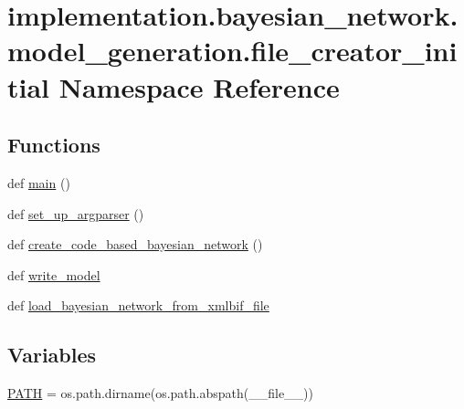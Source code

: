 \hypertarget{namespaceimplementation_1_1bayesian__network_1_1model__generation_1_1file__creator__initial}{}\section{implementation.\+bayesian\+\_\+network.\+model\+\_\+generation.\+file\+\_\+creator\+\_\+initial Namespace Reference}
\label{namespaceimplementation_1_1bayesian__network_1_1model__generation_1_1file__creator__initial}
\subsection*{Functions}
\begin{DoxyCompactItemize}
\item 
def \hyperlink{namespaceimplementation_1_1bayesian__network_1_1model__generation_1_1file__creator__initial_acbabd68f282f46c4163f51f4105cf89b}{main} ()
\item 
def \hyperlink{namespaceimplementation_1_1bayesian__network_1_1model__generation_1_1file__creator__initial_abcafef44805ec64399b6960daaa32b65}{set\+\_\+up\+\_\+argparser} ()
\item 
def \hyperlink{namespaceimplementation_1_1bayesian__network_1_1model__generation_1_1file__creator__initial_a03c80ffdeb14f95f6c3306e00e57734f}{create\+\_\+code\+\_\+based\+\_\+bayesian\+\_\+network} ()
\item 
def \hyperlink{namespaceimplementation_1_1bayesian__network_1_1model__generation_1_1file__creator__initial_a98d88f0c32f8caacc0f858c06b57e274}{write\+\_\+model}
\item 
def \hyperlink{namespaceimplementation_1_1bayesian__network_1_1model__generation_1_1file__creator__initial_ad52465018b3b77cc8304c9b6c8722225}{load\+\_\+bayesian\+\_\+network\+\_\+from\+\_\+xmlbif\+\_\+file}
\end{DoxyCompactItemize}
\subsection*{Variables}
\begin{DoxyCompactItemize}
\item 
\hyperlink{namespaceimplementation_1_1bayesian__network_1_1model__generation_1_1file__creator__initial_a1f7b6d779edc750c9861e591e9433304}{P\+A\+TH} = os.\+path.\+dirname(os.\+path.\+abspath(\+\_\+\+\_\+file\+\_\+\+\_\+))
\end{DoxyCompactItemize}


